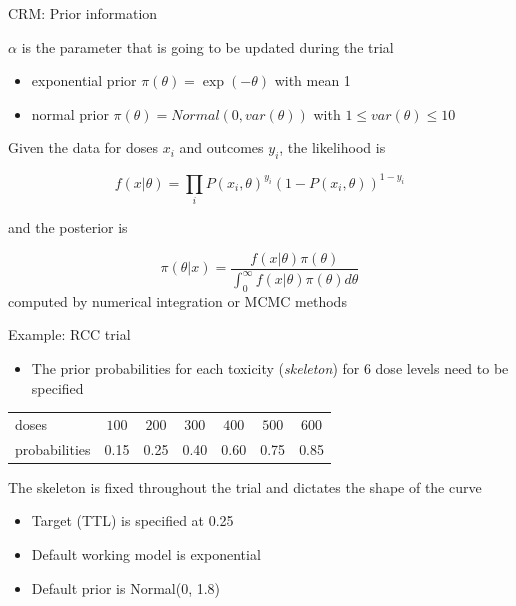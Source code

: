 \documentclass{beamer}
\begin{document}
\begin{frame}{CRM: Prior information}

\(\alpha\) is the parameter that is going to be updated during the trial

\begin{itemize}
\itemsep1pt\parskip0pt
\item
  exponential prior \(\pi(\theta) =\exp(-\theta)\) with mean 1
\item
  normal prior \(\pi(\theta)=Normal(0,var(\theta))\) with
  \(1\leq var(\theta) \leq 10\)
\end{itemize}

Given the data for doses \(x_i\) and outcomes \(y_i\), the likelihood is

\[
f(x\vert\theta) = \prod_i P(x_i,\theta)^{y_i}(1-P(x_i,\theta))^{1-y_i}
\]

and the posterior is

\[
\pi(\theta\vert x) = \frac{f(x\vert\theta)\pi(\theta)}{\int_0^\infty f(x\vert\theta)\pi(\theta)d\theta}
\] computed by numerical integration or MCMC methods

\end{frame}

\begin{frame}{Example: RCC trial}

\begin{itemize}
\itemsep1pt\parskip0pt
\item
  The prior probabilities for each toxicity (\emph{skeleton}) for 6 dose
  levels need to be specified
\end{itemize}

\begin{longtable}{lcccccc}
\toprule
doses & \(100\) & \(200\) & \(300\) & \(400\) &
\(500\) & \(600\)\tabularnewline
probabilities & 0.15 & 0.25 & 0.40 & 0.60 & 0.75 & 0.85\tabularnewline
\bottomrule
\end{longtable}

 The skeleton is fixed throughout the trial and dictates the shape of
the curve

\begin{itemize}
\itemsep1pt\parskip0pt
\item
  Target (TTL) is specified at 0.25
\item
  Default working model is exponential
\item
  Default prior is Normal(0, 1.8)
\end{itemize}

\end{frame}
\end{document}
